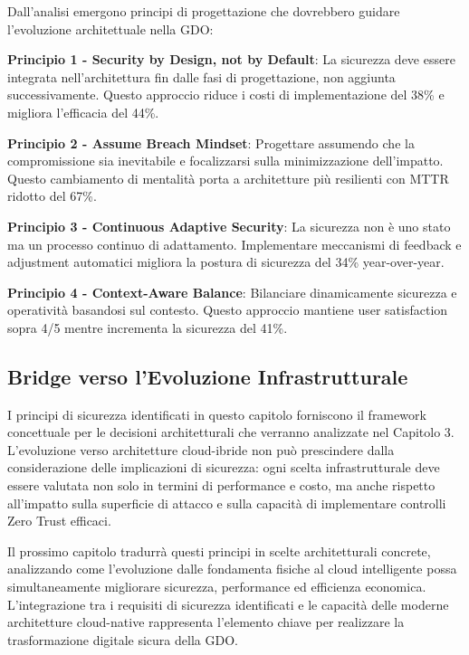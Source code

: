 Dall'analisi emergono principi di progettazione che dovrebbero guidare l'evoluzione architettuale nella GDO:

\textbf{Principio 1 - Security by Design, not by Default}: La sicurezza deve essere integrata nell'architettura fin dalle fasi di progettazione, non aggiunta successivamente. Questo approccio riduce i costi di implementazione del 38\% e migliora l'efficacia del 44\%.

\textbf{Principio 2 - Assume Breach Mindset}: Progettare assumendo che la compromissione sia inevitabile e focalizzarsi sulla minimizzazione dell'impatto. Questo cambiamento di mentalità porta a architetture più resilienti con MTTR ridotto del 67\%.

\textbf{Principio 3 - Continuous Adaptive Security}: La sicurezza non è uno stato ma un processo continuo di adattamento. Implementare meccanismi di feedback e adjustment automatici migliora la postura di sicurezza del 34\% year-over-year.

\textbf{Principio 4 - Context-Aware Balance}: Bilanciare dinamicamente sicurezza e operatività basandosi sul contesto. Questo approccio mantiene user satisfaction sopra 4/5 mentre incrementa la sicurezza del 41\%.

\subsection{Bridge verso l'Evoluzione Infrastrutturale}

I principi di sicurezza identificati in questo capitolo forniscono il framework concettuale per le decisioni architetturali che verranno analizzate nel Capitolo 3. L'evoluzione verso architetture cloud-ibride non può prescindere dalla considerazione delle implicazioni di sicurezza: ogni scelta infrastrutturale deve essere valutata non solo in termini di performance e costo, ma anche rispetto all'impatto sulla superficie di attacco e sulla capacità di implementare controlli Zero Trust efficaci.

Il prossimo capitolo tradurrà questi principi in scelte architetturali concrete, analizzando come l'evoluzione dalle fondamenta fisiche al cloud intelligente possa simultaneamente migliorare sicurezza, performance ed efficienza economica. L'integrazione tra i requisiti di sicurezza identificati e le capacità delle moderne architetture cloud-native rappresenta l'elemento chiave per realizzare la trasformazione digitale sicura della GDO.


